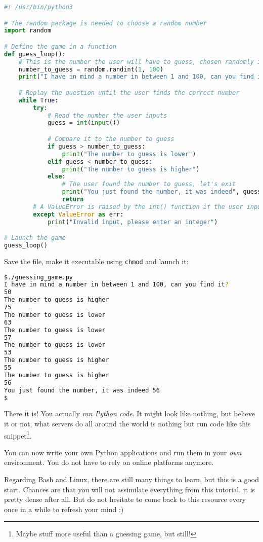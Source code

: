 \documentclass[12pt]{article}
\begin{document}
\begin{lstlisting}[language=python]
#! /usr/bin/python3

# The random package is needed to choose a random number
import random

# Define the game in a function
def guess_loop():
    # This is the number the user will have to guess, chosen randomly in between 1 and 100
    number_to_guess = random.randint(1, 100)
    print("I have in mind a number in between 1 and 100, can you find it?")

    # Replay the question until the user finds the correct number
    while True:
        try:
            # Read the number the user inputs
            guess = int(input())

            # Compare it to the number to guess
            if guess > number_to_guess:
                print("The number to guess is lower")
            elif guess < number_to_guess:
                print("The number to guess is higher")
            else:
                # The user found the number to guess, let's exit
                print("You just found the number, it was indeed", guess)
                return
        # A ValueError is raised by the int() function if the user inputs something else than a number
        except ValueError as err:
            print("Invalid input, please enter an integer")

# Launch the game
guess_loop()
\end{lstlisting}

Save the file, make it executable using \texttt{chmod} and launch it:

\begin{lstlisting}[language=bash]
$./guessing_game.py 
I have in mind a number in between 1 and 100, can you find it?
50
The number to guess is higher
75
The number to guess is lower
63
The number to guess is lower
57
The number to guess is lower
53
The number to guess is higher
55
The number to guess is higher
56
You just found the number, it was indeed 56
$
\end{lstlisting}

There it is! You actually \textit{ran Python code}. It might look like nothing, but believe it or not, what servers do all around the world is nothing but run code like this snippet\footnote{Maybe stuff more useful than a guessing game, but still!}.

You can now write your own Python applications and run them in your \textit{own} environment. You do not have to rely on online platforms anymore.

Regarding Bash and Linux, there are still many things to learn, but this is a good start. Chances are that you will not assimilate everything from this tutorial, it is pretty dense after all. But do not hesitate to come back to this resource every once in a while to refresh your mind :)
\end{document}
